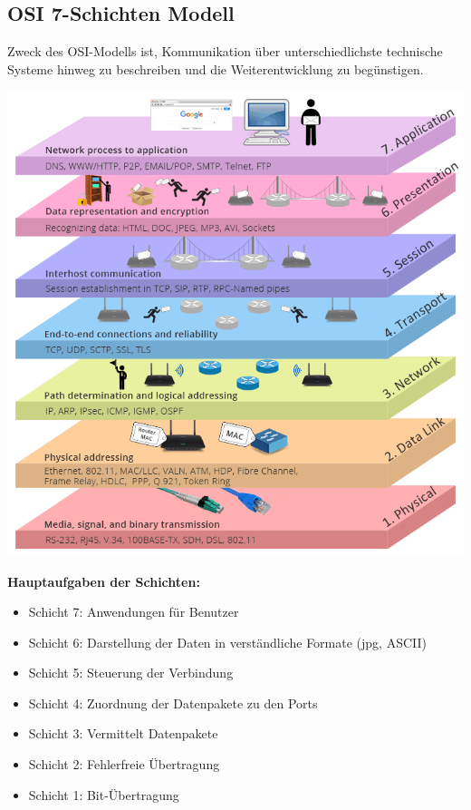 \documentclass[12pt,a4paper]{article}
\begin{document}
\subsection{OSI 7-Schichten Modell}
    Zweck des OSI-Modells ist, Kommunikation über unterschiedlichste technische Systeme hinweg zu beschreiben und die Weiterentwicklung zu begünstigen.\newline\newline
	\begin{minipage}{.5\textwidth}
		\includegraphics[scale=.45]{Bilder/OSI-Modell1}
	\end{minipage}
	\begin{minipage}{.5\textwidth}
		\textbf{Hauptaufgaben der Schichten:}
        \begin{itemize}
            \item Schicht 7: Anwendungen für Benutzer
            \item Schicht 6: Darstellung der Daten in verständliche Formate (jpg, ASCII)
            \item Schicht 5: Steuerung der Verbindung
            \item Schicht 4: Zuordnung der Datenpakete zu den Ports
            \item Schicht 3: Vermittelt Datenpakete
            \item Schicht 2: Fehlerfreie Übertragung
            \item Schicht 1: Bit-Übertragung 
        \end{itemize}
	\end{minipage}
\end{document}
